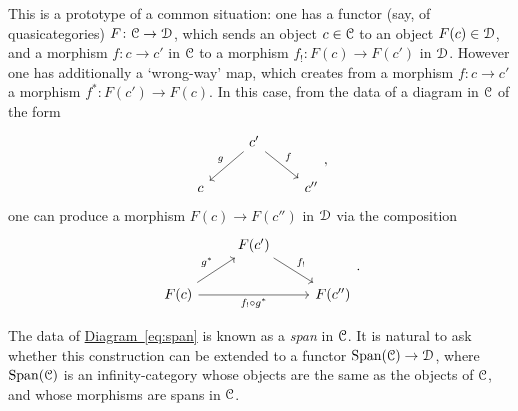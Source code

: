 \documentclass[main.tex]{subfiles}
\begin{document}
This is a prototype of a common situation: one has a functor (say, of quasicategories) $F\colon \mathcal{C} \to \mathcal{D}$, which sends an object $c \in \mathcal{C}$ to an object $F(c) \in \mathcal{D}$, and a morphism $f\colon c \to c'$ in $\mathcal{C}$ to a morphism $f_{!}\colon F(c) \to F(c')$ in $\mathcal{D}$. However one has additionally a `wrong-way' map, which creates from a morphism $f\colon c \to c'$ a morphism $f^{*}\colon F(c') \to F(c)$. In this case, from the data of a diagram in $\mathcal{C}$ of the form
\begin{equation}
  \label{eq:span}
  \begin{tikzcd}
    & c'
    \arrow[dl, swap, "g"]
    \arrow[dr, "f"]
    \\
    c
    && c''
  \end{tikzcd},
\end{equation}
one can produce a morphism $F(c) \to F(c'')$ in $\mathcal{D}$ via the composition
\begin{equation*}
  \begin{tikzcd}
    & F(c')
    \arrow[dr, "f_{!}"]
    \\
    F(c)
    \arrow[ur, "g^{*}"]
    \arrow[rr, swap, "f_{!} \circ g^{*}"]
    && F(c'')
  \end{tikzcd}.
\end{equation*}

The data of \hyperref[eq:span]{Diagram~\ref*{eq:span}} is known as a \emph{span} in $\mathcal{C}$. It is natural to ask whether this construction can be extended to a functor $\mathrm{Span}(\mathcal{C}) \to \mathcal{D}$, where $\mathrm{Span}(\mathcal{C})$ is an infinity-category whose objects are the same as the objects of $\mathcal{C}$, and whose morphisms are spans in $\mathcal{C}$.
\end{document}

